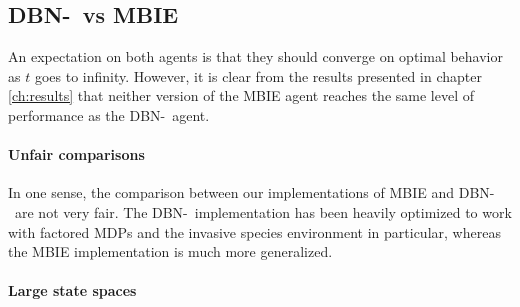 \subsection{DBN-\etre\ vs MBIE }
An expectation on both agents is that they should converge on optimal behavior as $t$ goes to infinity. However, it is clear from the results presented in chapter \ref{ch:results} that neither version of the MBIE agent reaches the same level of performance as the DBN-\etre\ agent. 

\paragraph{Unfair comparisons} In one sense, the comparison between our implementations of MBIE and DBN-\etre\ are not very fair. The DBN-\etre\ implementation has been heavily optimized to work with factored MDPs and the invasive species environment in particular, whereas the MBIE implementation is much more generalized. %

\paragraph{Large state spaces}


